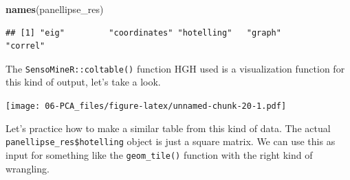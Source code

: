 \documentclass[
]{book}
\newenvironment{Shaded}{\begin{snugshade}}{\end{snugshade}}
\newcommand{\AttributeTok}[1]{\textcolor[rgb]{0.13,0.29,0.53}{#1}}
\newcommand{\FunctionTok}[1]{\textcolor[rgb]{0.13,0.29,0.53}{\textbf{#1}}}
\newcommand{\NormalTok}[1]{#1}
\newcommand{\SpecialCharTok}[1]{\textcolor[rgb]{0.81,0.36,0.00}{\textbf{#1}}}
\newcommand{\StringTok}[1]{\textcolor[rgb]{0.31,0.60,0.02}{#1}}
\begin{document}
\begin{Shaded}
\begin{Highlighting}[]
\FunctionTok{names}\NormalTok{(panellipse\_res)}
\end{Highlighting}
\end{Shaded}

\begin{verbatim}
## [1] "eig"         "coordinates" "hotelling"   "graph"       "correl"
\end{verbatim}

The \texttt{SensoMineR::coltable()} function HGH used is a visualization function for this kind of output, let's take a look.

\begin{Shaded}
\end{Shaded}

\texttt{[image: 06-PCA\_files/figure-latex/unnamed-chunk-20-1.pdf]}

Let's practice how to make a similar table from this kind of data. The actual \texttt{panellipse\_res\$hotelling} object is just a square matrix. We can use this as input for something like the \texttt{geom\_tile()} function with the right kind of wrangling.
\end{document}

